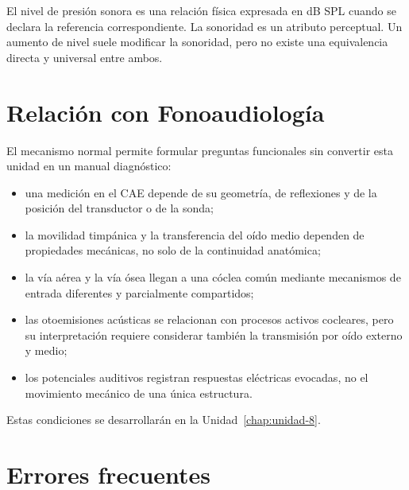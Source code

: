 
El nivel de presión sonora es una relación física expresada en dB SPL cuando
se declara la referencia correspondiente. La sonoridad es un atributo
perceptual. Un aumento de nivel suele modificar la sonoridad, pero no existe
una equivalencia directa y universal entre ambos.

\section{Relación con Fonoaudiología}
\label{sec:u6-relacion-fonoaudiologia}

El mecanismo normal permite formular preguntas funcionales sin convertir
esta unidad en un manual diagnóstico:

\begin{itemize}
    \item una medición en el CAE depende de su geometría, de reflexiones y de
    la posición del transductor o de la sonda;
    \item la movilidad timpánica y la transferencia del oído medio dependen de
    propiedades mecánicas, no solo de la continuidad anatómica;
    \item la vía aérea y la vía ósea llegan a una cóclea común mediante
    mecanismos de entrada diferentes y parcialmente compartidos;
    \item las otoemisiones acústicas se relacionan con procesos activos
    cocleares, pero su interpretación requiere considerar también la
    transmisión por oído externo y medio;
    \item los potenciales auditivos registran respuestas eléctricas evocadas,
    no el movimiento mecánico de una única estructura.
\end{itemize}

 Estas condiciones se desarrollarán en la
Unidad~\ref{chap:unidad-8}.

\section{Errores frecuentes}
\label{sec:u6-errores}

